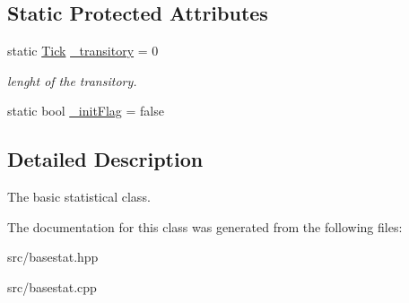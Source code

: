\subsection*{Static Protected Attributes}
\begin{DoxyCompactItemize}
\item 
static \hyperlink{classMetaSim_1_1Tick}{Tick} \hyperlink{group__metasim__stat_gabe2f955eab4756e73d411e41df17cf68}{\+\_\+transitory} = 0
\begin{DoxyCompactList}\small\item\em lenght of the transitory. \end{DoxyCompactList}\item 
static bool \hyperlink{group__metasim__stat_gac2cec74a9d6f8990cfb06fcd32327b60}{\+\_\+init\+Flag} = false
\end{DoxyCompactItemize}


\subsection{Detailed Description}
The basic statistical class. 

The documentation for this class was generated from the following files\+:\begin{DoxyCompactItemize}
\item 
src/basestat.\+hpp\item 
src/basestat.\+cpp\end{DoxyCompactItemize}
